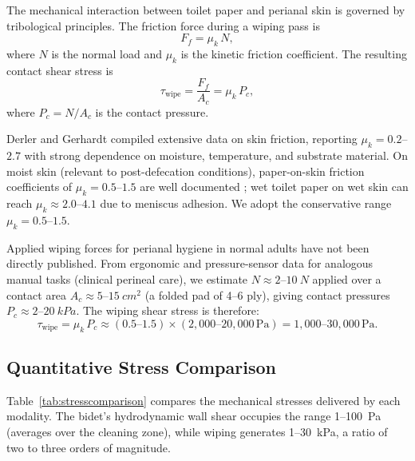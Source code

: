 \documentclass[10pt,letterpaper]{article}
\begin{document}
The mechanical interaction between toilet paper and perianal skin is governed
by tribological principles. The friction force during a wiping pass is
\begin{equation}
    F_f = \mu_k\,N,
    \label{eq:friction}
\end{equation}
where $N$ is the normal load and $\mu_k$ is the kinetic friction coefficient.
The resulting contact shear stress is
\begin{equation}
    \tau_\mathrm{wipe} = \frac{F_f}{A_c} = \mu_k\,P_c,
    \label{eq:contactshear}
\end{equation}
where $P_c = N/A_c$ is the contact pressure.

Derler and Gerhardt \citep{Derler2012} compiled extensive data on skin
friction, reporting $\mu_k = 0.2$--$2.7$ with strong dependence on
moisture, temperature, and substrate material. On moist skin (relevant to
post-defecation conditions), paper-on-skin friction coefficients of
$\mu_k = 0.5$--$1.5$ are well documented \citep{Vilhena2023}; wet toilet
paper on wet skin can reach $\mu_k \approx 2.0$--$4.1$ due to meniscus
adhesion. We adopt the conservative range $\mu_k = 0.5$--$1.5$.

Applied wiping forces for perianal hygiene in normal adults have not been
directly published. From ergonomic and pressure-sensor data for analogous
manual tasks (clinical perineal care), we estimate $N \approx 2$--$10~N$
applied over a contact area $A_c \approx 5$--$15~cm^2$ (a folded pad
of 4--6 ply), giving contact pressures $P_c \approx 2$--$20~kPa$.
The wiping shear stress is therefore:
\begin{equation}
    \tau_\mathrm{wipe} = \mu_k\,P_c \approx (0.5\text{--}1.5)
    \times (2{,}000\text{--}20{,}000\,\mathrm{Pa})
    = 1{,}000\text{--}30{,}000\,\mathrm{Pa}.
    \label{eq:wiperange}
\end{equation}

\subsection{Quantitative Stress Comparison}

Table~\ref{tab:stresscomparison} compares the mechanical stresses delivered
by each modality. The bidet's hydrodynamic wall shear occupies the range
1--100~Pa (averages over the cleaning zone), while wiping
generates 1--30~kPa, a ratio of two to three orders of
magnitude.
\end{document}
